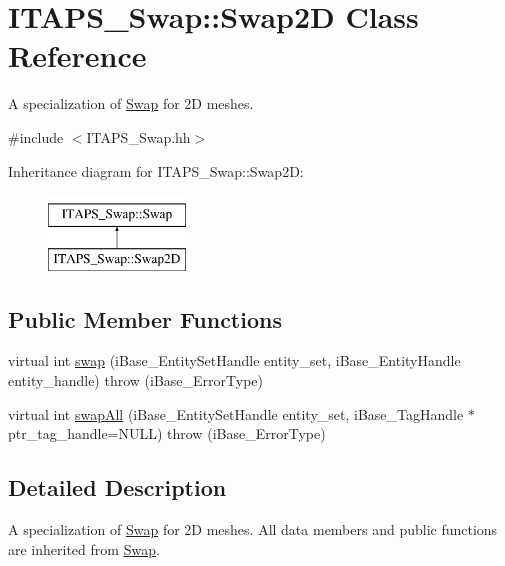 \hypertarget{class_i_t_a_p_s___swap_1_1_swap2_d}{
\section{ITAPS\_\-Swap::Swap2D Class Reference}
\label{class_i_t_a_p_s___swap_1_1_swap2_d}
}


A specialization of \hyperlink{class_i_t_a_p_s___swap_1_1_swap}{Swap} for 2D meshes.  




{\ttfamily \#include $<$ITAPS\_\-Swap.hh$>$}

Inheritance diagram for ITAPS\_\-Swap::Swap2D:\begin{figure}[H]
\begin{center}
\leavevmode
\includegraphics[height=2cm]{class_i_t_a_p_s___swap_1_1_swap2_d}
\end{center}
\end{figure}
\subsection*{Public Member Functions}
\begin{DoxyCompactItemize}
\item 
virtual int \hyperlink{class_i_t_a_p_s___swap_1_1_swap2_d_a84a78678e5e830d16c725a93f3b5038f}{swap} (iBase\_\-EntitySetHandle entity\_\-set, iBase\_\-EntityHandle entity\_\-handle)  throw (iBase\_\-ErrorType)
\item 
virtual int \hyperlink{class_i_t_a_p_s___swap_1_1_swap2_d_a4bee7d3a08e3ff6ac85a81ec321479ef}{swapAll} (iBase\_\-EntitySetHandle entity\_\-set, iBase\_\-TagHandle $\ast$ptr\_\-tag\_\-handle=NULL)  throw (iBase\_\-ErrorType)
\end{DoxyCompactItemize}


\subsection{Detailed Description}
A specialization of \hyperlink{class_i_t_a_p_s___swap_1_1_swap}{Swap} for 2D meshes. All data members and public functions are inherited from \hyperlink{class_i_t_a_p_s___swap_1_1_swap}{Swap}. 

